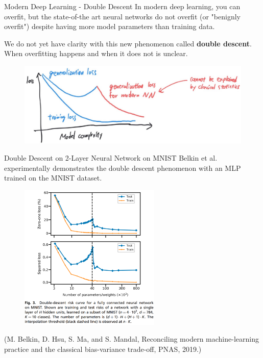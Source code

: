 \begin{frame}[allowframebreaks]

\begin{mydefinitionblock}{6.4}{Modern Deep Learning - Double Descent}
    In modern deep learning, you can overfit, but the state-of-the art neural networks do not overfit (or "benignly overfit") despite having more model parameters than training data.

    We do not yet have clarity with this new phenomenon called \textbf{double descent}. When overfitting happens and when it does not is unclear.

    \begin{figure}[H]
        \centering
        \includegraphics[width=1.0\textwidth]{.././assets/6.4.jpg}
    \end{figure}
\end{mydefinitionblock}

\end{frame}

\begin{frame}[allowframebreaks]

\begin{myexampleblock}{6.5}{Double Descent on 2-Layer Neural Network on MNIST}
    Belkin et al. experimentally demonstrates the double descent phenomenon with an MLP trained on the MNIST dataset.

    \begin{figure}[H]
        \centering
        \includegraphics[width=0.6\textwidth]{.././assets/6.5.png}
    \end{figure}

    (M. Belkin, D. Hsu, S. Ma, and S. Mandal, Reconciling modern machine-learning practice and the classical bias-variance trade-off, PNAS, 2019.)
\end{myexampleblock}

\end{frame}


